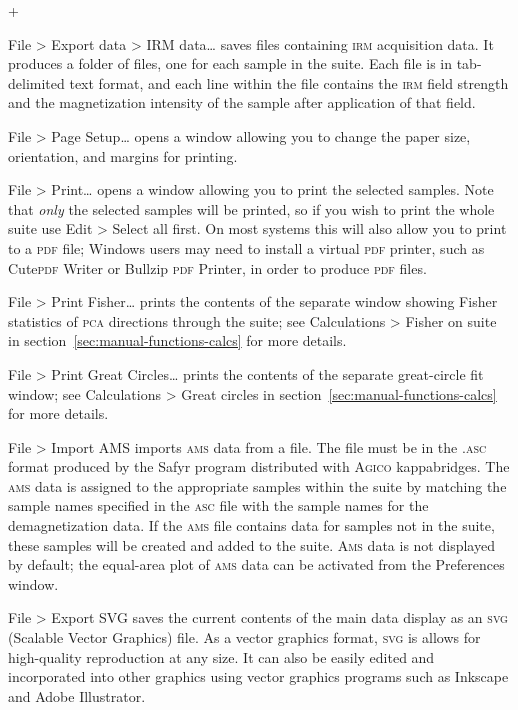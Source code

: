 \documentclass[a4paper]{article}
\newcommand{\menuitemlabel}[1]{%
\mbox{\textsf{#1}}\hfil}
\newenvironment{menuitemlist}%
{\begin{list}{}{%
\renewcommand{\makelabel}{\menuitemlabel}%
\setlength{\labelwidth}{35pt}%
\setlength{\leftmargin}%
             {\labelwidth+\labelsep}}}%
{\end{list}}
\newcommand{\ppcmd}[1]{\textsf{#1}} %
\newcommand{\caps}[1]{\textsc{#1}} %
\newcommand{\submenu}{ \textgreater{} } %
\begin{document}
\begin{menuitemlist}
\item[File\submenu Export data\submenu IRM data\ldots] saves files containing
\caps{irm} acquisition data. It produces a folder of files, one for each
sample in the suite. Each file is in tab-delimited text format, and each line
within the file contains the \caps{irm} field strength and the magnetization
intensity of the sample after application of that field.

\item[File\submenu Page Setup\ldots] opens a window allowing you
to change the paper size, orientation, and margins for printing.

\item[File\submenu Print\ldots] opens a window allowing you to print the
selected samples. Note that {\em only} the selected samples will be printed,
so if you wish to print the whole suite use \ppcmd{Edit\submenu Select all} first.
On most systems this will also allow you to print to a \caps{pdf} file;
Windows users may need to install a virtual \caps{pdf} printer, such as
Cute\caps{pdf} Writer or Bullzip \caps{pdf} Printer, in order to produce
\caps{pdf} files.

\item[File\submenu Print Fisher\ldots] prints the contents of the separate
window showing Fisher statistics of \caps{pca} directions through the suite;
see \ppcmd{Calculations\submenu Fisher on suite} in
section~\ref{sec:manual-functions-calcs} for more details.

\item[File\submenu Print Great Circles\ldots] prints the contents of the
  separate great-circle fit window; see \ppcmd{Calculations\submenu Great
    circles} in section~\ref{sec:manual-functions-calcs} for more details.

\item[File\submenu Import AMS] imports \caps{ams} data from a file. The
file must be in the \caps{.asc} format produced by the \ppcmd{Safyr} program
distributed with \caps{Agico} kappabridges. The \caps{ams} data is assigned
to the appropriate samples within the suite by matching the sample names
specified in the \caps{asc} file with the sample names for the
demagnetization data. If the \caps{ams} file contains data for samples not in
the suite, these samples will be created and added to the suite. \caps{Ams}
data is not displayed by default; the equal-area plot of \caps{ams} data can
be activated from the \ppcmd{Preferences} window.

\item[File\submenu Export SVG] saves the current contents of the main
data display as an \caps{svg} (Scalable Vector Graphics) file. As a vector
graphics format, \caps{svg} is allows for high-quality reproduction at any
size. It can also be easily edited and incorporated into other graphics using
vector graphics programs such as Inkscape and Adobe Illustrator.


\end{menuitemlist}
\end{document}
